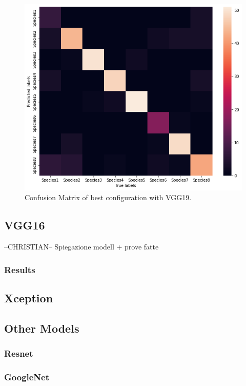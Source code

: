 \documentclass[10pt]{article}
\begin{document}
\begin{figure}[ht]
\begin{center}
\centerline{\includegraphics[width=\columnwidth]{VGG19_best}}
\caption{Confusion Matrix of best configuration with VGG19.}
\label{bayespic}
\end{center}
\end{figure}


\subsection{VGG16}
--CHRISTIAN--
Spiegazione modell + prove fatte
\subsubsection{Results}
\subsection{Xception}

\subsection{Other Models}
\subsubsection{Resnet}
\subsubsection{GoogleNet}
\end{document}
